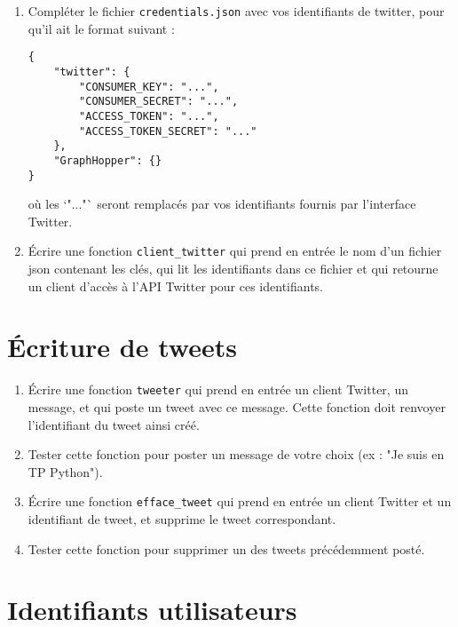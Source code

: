 \documentclass[11pt,a4paper]{article}
\begin{document}
\begin{enumerate}
    \item Compléter le fichier \verb+credentials.json+ avec vos identifiants de twitter, pour qu'il ait le format suivant : 
\begin{verbatim}
{
    "twitter": {
        "CONSUMER_KEY": "...",
        "CONSUMER_SECRET": "...",
        "ACCESS_TOKEN": "...",
        "ACCESS_TOKEN_SECRET": "..."
    },
    "GraphHopper": {}
}

\end{verbatim}
où les `"..."` seront remplacés par vos identifiants fournis par l'interface Twitter.

\item Écrire une fonction \verb+client_twitter+ qui prend en entrée le nom d'un fichier json contenant les clés, qui lit les identifiants dans ce fichier et qui retourne un client d'accès à l'API Twitter pour ces identifiants.
\end{enumerate}




\section{Écriture de tweets}
\begin{enumerate}
    \item Écrire une fonction \verb+tweeter+ qui prend en entrée un client Twitter, un message, et qui poste un tweet avec ce message. 
    Cette fonction doit renvoyer l'identifiant du tweet ainsi créé.
    \item Tester cette fonction pour poster un message de votre choix (ex : "Je suis en TP Python"). 
    \item Écrire une fonction \verb+efface_tweet+ qui prend en entrée un client Twitter et un identifiant de tweet, et supprime le tweet correspondant.
    \item Tester cette fonction pour supprimer un des tweets précédemment posté.
\end{enumerate}


\section{Identifiants utilisateurs}
\end{document}
